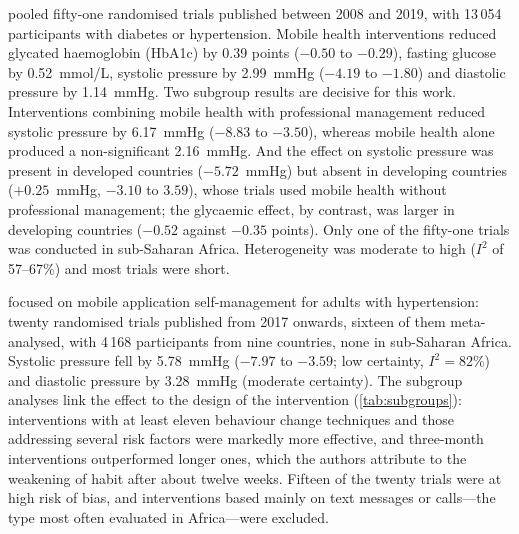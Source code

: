 \documentclass[12pt,a4paper,oneside]{report}
\begin{document}
\Textcite{mao2020} pooled fifty-one randomised trials published between 2008 and 2019, with 13\,054 participants with diabetes or hypertension. Mobile health interventions reduced glycated haemoglobin (HbA1c) by 0.39 points ($-0.50$ to $-0.29$), fasting glucose by 0.52~mmol/L, systolic pressure by 2.99~mmHg ($-4.19$ to $-1.80$) and diastolic pressure by 1.14~mmHg. Two subgroup results are decisive for this work. Interventions combining mobile health with professional management reduced systolic pressure by 6.17~mmHg ($-8.83$ to $-3.50$), whereas mobile health alone produced a non-significant 2.16~mmHg. And the effect on systolic pressure was present in developed countries ($-5.72$~mmHg) but absent in developing countries ($+0.25$~mmHg, $-3.10$ to $3.59$), whose trials used mobile health without professional management; the glycaemic effect, by contrast, was larger in developing countries ($-0.52$ against $-0.35$ points). Only one of the fifty-one trials was conducted in sub-Saharan Africa. Heterogeneity was moderate to high ($I^2$ of 57--67\%) and most trials were short.

\Textcite{zhou2024} focused on mobile application self-management for adults with hypertension: twenty randomised trials published from 2017 onwards, sixteen of them meta-analysed, with 4\,168 participants from nine countries, none in sub-Saharan Africa. Systolic pressure fell by 5.78~mmHg ($-7.97$ to $-3.59$; low certainty, $I^2 = 82\%$) and diastolic pressure by 3.28~mmHg (moderate certainty). The subgroup analyses link the effect to the design of the intervention (\cref{tab:subgroups}): interventions with at least eleven behaviour change techniques and those addressing several risk factors were markedly more effective, and three-month interventions outperformed longer ones, which the authors attribute to the weakening of habit after about twelve weeks. Fifteen of the twenty trials were at high risk of bias, and interventions based mainly on text messages or calls---the type most often evaluated in Africa---were excluded.
\end{document}
